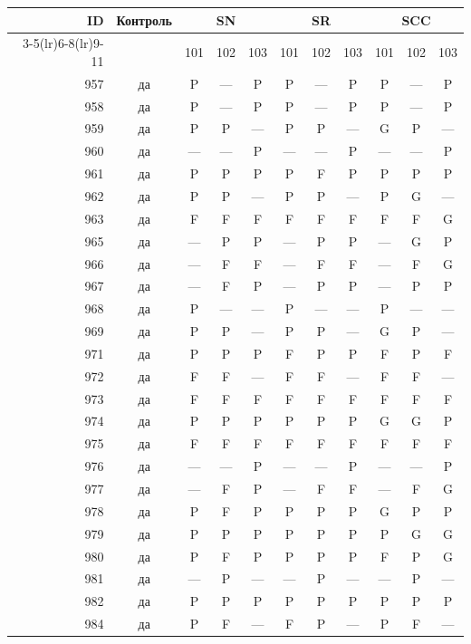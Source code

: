 \begin{table}[p]\centering\small
\begin{tabular*}{\textwidth}{@{\extracolsep{\fill}}rc*{9}{c}@{}}\toprule
ID & Контроль & \multicolumn{3}{c}{SN} & \multicolumn{3}{c}{SR} & \multicolumn{3}{c}{SCC}\\
\cmidrule(lr){3-5}\cmidrule(lr){6-8}\cmidrule(lr){9-11}
 & & 101 & 102 & 103 & 101 & 102 & 103 & 101 & 102 & 103\\\midrule
957 & да & P & — & P & P & — & P & P & — & P\\
958 & да & P & — & P & P & — & P & P & — & P\\
959 & да & P & P & — & P & P & — & G & P & —\\
960 & да & — & — & P & — & — & P & — & — & P\\
961 & да & P & P & P & P & F & P & P & P & P\\
962 & да & P & P & — & P & P & — & P & G & —\\
963 & да & F & F & F & F & F & F & F & F & G\\
965 & да & — & P & P & — & P & P & — & G & P\\
966 & да & — & F & F & — & F & F & — & F & G\\
967 & да & — & F & P & — & P & P & — & P & P\\
968 & да & P & — & — & P & — & — & P & — & —\\
969 & да & P & P & — & P & P & — & G & P & —\\
971 & да & P & P & P & F & P & P & F & P & F\\
972 & да & F & F & — & F & F & — & F & F & —\\
973 & да & F & F & F & F & F & F & F & F & F\\
974 & да & P & P & P & P & P & P & G & G & P\\
975 & да & F & F & F & F & F & F & F & F & F\\
976 & да & — & — & P & — & — & P & — & — & P\\
977 & да & — & F & P & — & F & F & — & F & G\\
978 & да & P & F & P & P & P & P & G & P & P\\
979 & да & P & P & P & P & P & P & P & G & G\\
980 & да & P & F & P & P & P & P & F & P & G\\
981 & да & — & P & — & — & P & — & — & P & —\\
982 & да & P & P & P & P & P & P & P & P & P\\
984 & да & P & F & — & F & P & — & P & F & —\\

\end{tabular*}
\end{table}
